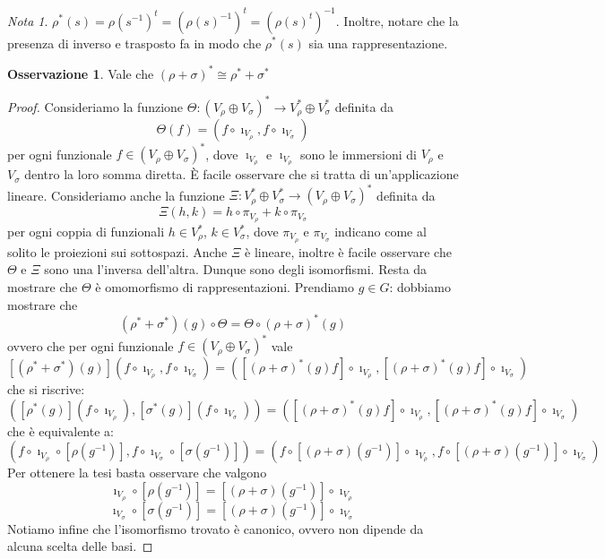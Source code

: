 \documentclass[11pt]{article}
\theoremstyle{plain}
\theoremstyle{definition}
\newtheorem*{rem}{Osservazione}
\theoremstyle{remark}
\newtheorem*{note}{Nota}
\begin{document}
\begin{note}
$\rho^*(s)=\rho(s^{-1})^t=\left(\rho(s)^{-1}\right)^t=\left(\rho(s)^t\right)^{-1}$. Inoltre, notare che la presenza di inverso e trasposto fa in modo che $\rho^*(s)$ sia una rappresentazione.
\end{note}


\begin{rem}
	Vale che $(\rho + \sigma)^* \cong \rho^* + \sigma^*$
\end{rem}

\begin{proof}
Consideriamo la funzione $\Theta : (V_\rho \oplus V_\sigma)^*\to V_\rho ^* \oplus V_\sigma ^*$ definita da
\[ \Theta(f) = (f\circ \imath_{V_\rho}, f\circ \imath_{V_\sigma}) \]
per ogni funzionale $f\in (V_\rho \oplus V_\sigma)^*$, dove $\imath_{V_\rho}$ e $\imath_{V_\rho}$ sono le immersioni di $V_\rho$ e $V_\sigma$ dentro la loro somma diretta.
\`E facile osservare che si tratta di un'applicazione lineare. Consideriamo anche
la funzione $\Xi: V_\rho ^* \oplus V_\sigma ^* \to (V_\rho \oplus V_\sigma)^*$ definita da
\[ \Xi(h,k) = h\circ\pi_{V_\rho} + k\circ\pi_{V_\sigma} \]
per ogni coppia di funzionali $h\in V_\rho ^*$, $k\in V_\sigma ^*$,
dove $\pi_{V_\rho}$ e $\pi_{V_\sigma}$ indicano come al solito le proiezioni sui sottospazi. 
Anche $\Xi$ è lineare, inoltre è facile osservare che $\Theta$ e $\Xi$ sono una l'inversa dell'altra. Dunque sono degli 
isomorfismi. Resta da mostrare che $\Theta$ è omomorfismo di rappresentazioni. Prendiamo $g\in G$: dobbiamo mostrare che 
\[ (\rho^*+\sigma^*)(g) \circ \Theta = \Theta \circ (\rho + \sigma)^*(g) \]
ovvero che per ogni funzionale $f\in (V_\rho \oplus V_\sigma)^*$ vale
\[ [(\rho^*+\sigma^*)(g)] (f\circ \imath_{V_\rho}, f\circ \imath_{V_\sigma}) = ([(\rho + \sigma)^*(g)f]\circ \imath_{V_\rho}, [(\rho + \sigma)^*(g)f]\circ \imath_{V_\sigma}) \]
che si riscrive:
\[ ([\rho^*(g)](f\circ \imath_{V_\rho}), [\sigma^*(g)](f\circ \imath_{V_\sigma})) = ([(\rho + \sigma)^*(g)f]\circ \imath_{V_\rho}, [(\rho + \sigma)^*(g)f]\circ \imath_{V_\sigma}) \]
che è equivalente a:
\[ (f\circ \imath_{V_\rho} \circ [\rho(g^{-1})], f\circ \imath_{V_\sigma}\circ[\sigma(g^{-1})]) = (f\circ [(\rho+\sigma)(g^{-1})] \circ \imath_{V_\rho} , f\circ[(\rho+\sigma)(g^{-1})]\circ \imath_{V_\sigma}) \]
Per ottenere la tesi basta osservare che valgono
\[ \imath_{V_\rho} \circ [\rho(g^{-1})] = [(\rho+\sigma)(g^{-1})] \circ \imath_{V_\rho}\]
\[\imath_{V_\sigma} \circ [\sigma(g^{-1})] = [(\rho+\sigma)(g^{-1})] \circ \imath_{V_\sigma}\]
Notiamo infine che l'isomorfismo trovato è canonico, ovvero non dipende da alcuna scelta delle basi.
\end{proof}
\end{document}
